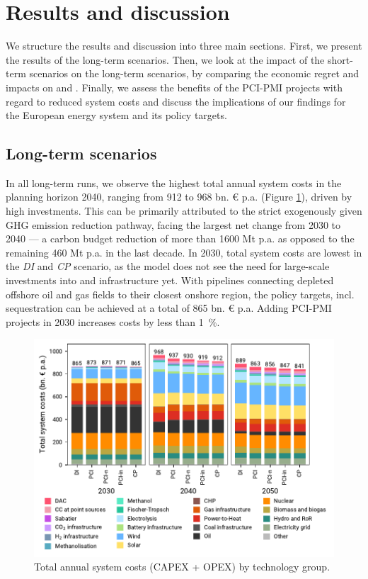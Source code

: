 \documentclass[preprint,12pt,sort&compress]{elsarticle}
\begin{document}
\section{Results and discussion}
\label{sec:results_and_discussion}
We structure the results and discussion into three main sections. First, we present the results of the long-term scenarios. Then, we look at the impact of the short-term scenarios on the long-term scenarios, by comparing the economic regret and impacts on  and . Finally, we assess the benefits of the PCI-PMI projects with regard to reduced system costs and discuss the implications of our findings for the European energy system and its policy targets. 

\subsection{Long-term scenarios}
\label{sec:long-term_scenarios}
In all long-term runs, we observe the highest total annual system costs in the planning horizon 2040, ranging from 912 to 968 bn. \euro{} p.a. (Figure \ref{fig:costs_overview}), driven by high investments. This can be primarily attributed to the strict exogenously given GHG emission reduction pathway, facing the largest net change from 2030 to 2040 --- a carbon budget reduction of more than 1600 Mt p.a. as opposed to the remaining 460 Mt p.a. in the last decade. In 2030, total system costs are lowest in the \textit{DI} and \textit{CP} scenario, as the model does not see the need for large-scale investments into  and  infrastructure yet. With  pipelines connecting depleted offshore oil and gas fields to their closest onshore region, the policy targets, incl.  sequestration can be achieved at a total of 865 bn. \euro{} p.a. Adding PCI-PMI projects in 2030 increases costs by less than \SI{1}{\percent}. 

\begin{figure}[htbp]
  \centering
  \includegraphics[width=\linewidth]{costs_overview.pdf}
  \caption{Total annual system costs (CAPEX + OPEX) by technology group.}
  \label{fig:costs_overview}
\end{figure}
\end{document}
